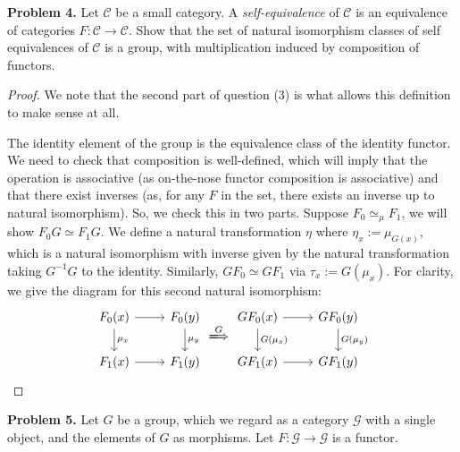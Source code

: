 \documentclass[reqno]{amsart}
\theoremstyle{definition}
\theoremstyle{remark}
\newcommand{\prob}[1] {
  \textbf{Problem #1.}
}
\begin{document}
\prob{4} Let $\mathcal{C}$ be a small category. A \textit{self-equivalence} of
$\mathcal{C}$ is an equivalence of categories $F : \mathcal{C} \to \mathcal{C}$.
Show that the set of natural isomorphism classes of self equivalences of
$\mathcal{C}$ is a group, with multiplication induced by composition of
functors.

\begin{proof}
  We note that the second part of question ($3$) is what allows this definition
  to make sense at all.

  The identity element of the group is the equivalence class of the identity
  functor. We need to check that composition is well-defined, which will imply
  that the operation is associative (as on-the-nose functor composition is
  associative) and that there exist inverses (as, for any $F$ in the set, there
  exists an inverse up to natural isomorphism). So, we check this in two parts.
  Suppose $F_0 \simeq_{\mu} F_1$, we will show $F_0 G \simeq F_1 G$. We define a
  natural transformation $\eta$ where $\eta_x := \mu_{G(x)}$, which is a natural
  isomorphism with inverse given by the natural transformation taking $G^{-1}G$
  to the identity. Similarly, $G F_0 \simeq G F_1$ via $\tau_x := G(\mu_x)$. For
  clarity, we give the diagram for this second natural isomorphism:
  \[
    \begin{tikzcd}
      F_0(x) \ar[r] \ar[d, "\mu_x"] & F_0(y) \ar[d, "\mu_{y}"] \\
      F_1(x) \ar[r] & F_1(y)
    \end{tikzcd}
    \xLongrightarrow[]{G}
    \begin{tikzcd}
      GF_0(x) \ar[r] \ar[d, "G(\mu_x)"] & GF_0(y) \ar[d, "G(\mu_{y})"] \\
      GF_1(x) \ar[r] & GF_1(y)
    \end{tikzcd}
  \]
\end{proof}

\prob{5} Let $G$ be a group, which we regard as a category $\mathcal{G}$ with a
single object, and the elements of $G$ as morphisms. Let $F : \mathcal{G} \to
\mathcal{G}$ is a functor.
\end{document}
